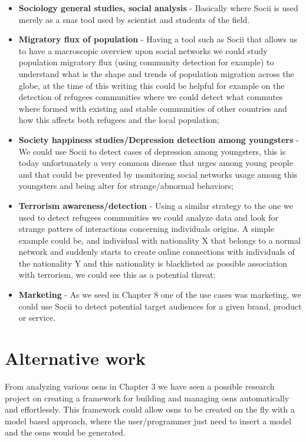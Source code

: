\begin{itemize}
    \item \textbf{Sociology general studies, social analysis} - Basically where Socii is used merely as a \glspl{sna} tool used by scientist and students of the field.
    \item \textbf{Migratory flux of population} - Having a tool such as Socii that allows us to have a macroscopic overview upon social networks we could study population migratory flux (using community detection for example) to understand what is the shape and trends of population migration across the globe, at the time of this writing this could be helpful for example on the detection of refugees communities where we could detect what commutes where formed with existing and stable communities of other countries and how this affects both refugees and the local population;
    \item \textbf{Society happiness studies/Depression detection among youngsters} - We could use Socii to detect cases of depression among youngsters, this is today
    unfortunately a very common disease that urges among young people and that could be prevented by monitoring social networks usage among this youngsters and being alter
    for strange/abnormal behaviors;
    \item \textbf{Terrorism awareness/detection} - Using a similar strategy to the one we used to detect refugees communities we could analyze data and look for strange patters of interactions concerning individuals origins. A simple example could be, and individual with nationality X that belongs to a normal network and suddenly starts to create online connections with individuals of the nationality Y and this nationality is blacklisted as possible association with terrorism, we could see this as a potential threat;
    \item \textbf{Marketing} - As we seed in Chapter 8 one of the use cases was marketing, we could use Socii to detect potential target audiences for a given brand, product or service.
\end{itemize}

\section{Alternative work}
From analyzing various \glspl{osn} in Chapter 3 we have seen a possible research project on creating a framework for building
and managing \glspl{osn} automatically and effortlessly. This framework could allow \glspl{osn} to be created on the fly with a model based approach, where the user/programmer
just need to insert a model and the \glspl{osn} would be generated.

